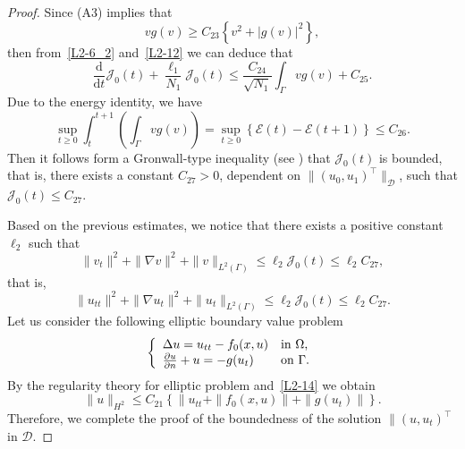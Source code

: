 \documentclass{elsarticle}
\begin{document}
\begin{proof}
Since (A3) implies that
\[
vg(v)\geqslant C_{23}\left\{v^2+|g(v)|^2\right\},
\]
then from~\eqref{L2-6_2} and~\eqref{L2-12} we can deduce that
\begin{equation} \label{L2-13}
\frac{\mathrm{d}}{\mathrm{d}t}\mathcal{J}_0(t) +  \frac{\ell_1}{N_1}\mathcal{J}_{0}(t)\leqslant \frac{C_{24}}{\sqrt{N_1}}\int_{\Gamma}vg(v) +C_{25}.
\end{equation}
Due to the energy identity, we have
\[
	\sup_{t\geqslant 0}\int_{t}^{t+1}\left(\int_{\Gamma}v g(v)\right) = \sup_{t\geqslant 0}\left\{\mathcal{E}(t)- \mathcal{E}(t+1)\right\} \leqslant C_{26}.
\]
Then it follows form a Gronwall-type inequality (see \cite[Lemma 2.2]{grasselli2004asymptotic}) that $\mathcal{J}_0(t)$ is bounded, that is, there exists a constant $C_{27}>0$, dependent on $\|(u_0, u_1)^{\top}\|_{\mathcal{D}}$, such that $\mathcal{J}_0(t)\leqslant C_{27}$.

Based on the previous estimates, we notice that there exists a positive constant $\ell_2$ such that
\begin{equation*}
	\|v_t\|^2 + \|\nabla v\|^2 + \|v\|_{L^2({\Gamma})} \leqslant \ell_2\mathcal{J}_0(t)\leqslant \ell_2 C_{27},
\end{equation*}
that is,
\begin{equation}\label{L2-14}
	\|u_{tt}\|^2 + \|\nabla u_t\|^2 + \|u_t\|_{L^2({\Gamma})} \leqslant \ell_2\mathcal{J}_0(t)\leqslant \ell_2 C_{27}.
\end{equation}
Let us consider the following elliptic boundary value problem
\begin{equation*}
\left
    \{
        \begin{array}{ll}
	\Delta u=u_{tt}-f_0(x, u) &\textrm{in $ \Omega$,} \\
	\frac{\partial u}{\partial n}+u=-g(u_t) &\textrm{on $ \Gamma$.}
        \end{array}
\right.
\end{equation*}
By the regularity theory for elliptic problem and~\eqref{L2-14} we obtain
\[
\|u\|_{H^2}\leqslant C_{21}\left\{\|u_{tt}+ \|f_0(x, u)\| +\|g(u_t)\|\right\}.
\]
Therefore, we complete the proof of the boundedness of the solution $\|(u, u_t)^{\top}$ in $\mathcal{D}$.  


\end{proof}
\end{document}
